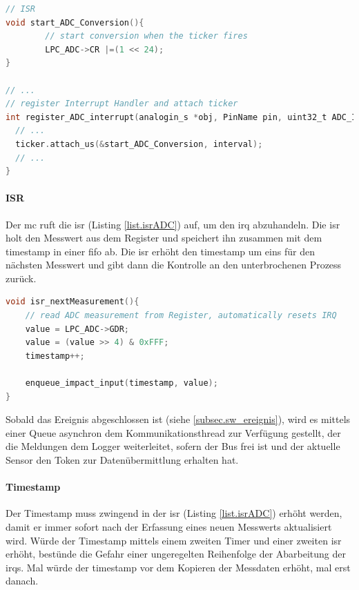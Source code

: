 \begin{lstlisting}[language=C,caption=Timer mit Aufruf der A/D-Wandler-Funktion (ADC\_4088.cpp), label=list.tickerADC]
// ISR 
void start_ADC_Conversion(){
		// start conversion when the ticker fires
		LPC_ADC->CR |=(1 << 24);
}

// ...
// register Interrupt Handler and attach ticker
int register_ADC_interrupt(analogin_s *obj, PinName pin, uint32_t ADC_IRQHandler, uint32_t interval){
  // ...
  ticker.attach_us(&start_ADC_Conversion, interval);
  // ...
}
\end{lstlisting}

\paragraph{ISR} Der \gls{mc} ruft die \gls{isr} (Listing \ref{list.isrADC}) auf, um den \gls{irq} abzuhandeln. Die \gls{isr} holt den Messwert aus dem Register und speichert ihn zusammen mit dem \gls{timestamp} in einer \gls{fifo} ab. Die \gls{isr} erhöht den \gls{timestamp} um eins für den nächsten Messwert und gibt dann die Kontrolle an den unterbrochenen Prozess zurück.

\begin{lstlisting}[language=C,caption=ISR zur Abhandlung des ADC-Interrupt Requests (impact\_event.cpp), label=list.isrADC]
void isr_nextMeasurement(){
	// read ADC measurement from Register, automatically resets IRQ
	value = LPC_ADC->GDR;
	value = (value >> 4) & 0xFFF;
	timestamp++;
	
	enqueue_impact_input(timestamp, value);
}
\end{lstlisting}

Sobald das Ereignis abgeschlossen ist (siehe \ref{subsec.sw_ereignis}), wird es mittels einer Queue asynchron dem Kommunikationsthread zur Verfügung gestellt, der die Meldungen dem Logger weiterleitet, sofern der Bus frei ist und der aktuelle Sensor den Token zur Datenübermittlung erhalten hat.

\paragraph{Timestamp} Der Timestamp muss zwingend in der \gls{isr} (Listing \ref{list.isrADC}) erhöht werden, damit er immer sofort nach der Erfassung eines neuen Messwerts aktualisiert wird. Würde der Timestamp mittels einem zweiten Timer und einer zweiten \gls{isr} erhöht, bestünde die Gefahr einer ungeregelten Reihenfolge der Abarbeitung der \gls{irq}s. Mal würde der \gls{timestamp} vor dem Kopieren der Messdaten erhöht, mal erst danach.

